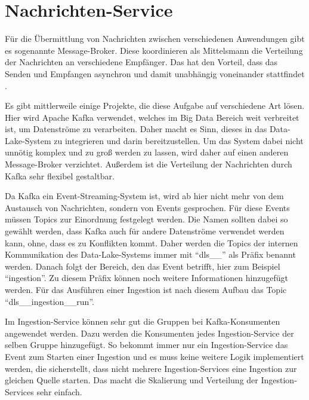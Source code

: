 \section{Nachrichten-Service}

Für die Übermittlung von Nachrichten zwischen verschiedenen Anwendungen gibt es sogenannte Message-Broker.
Diese koordinieren als Mittelsmann die Verteilung der Nachrichten an verschiedene Empfänger.
Das hat den Vorteil, dass das Senden und Empfangen asynchron und damit unabhängig voneinander stattfindet \parencite{message-broker}.

Es gibt mittlerweile einige Projekte, die diese Aufgabe auf verschiedene Art lösen.
Hier wird Apache Kafka verwendet, welches im Big Data Bereich weit verbreitet ist, um Datenströme zu verarbeiten.
Daher macht es Sinn, dieses in das Data-Lake-System zu integrieren und darin bereitzustellen.
Um das System dabei nicht unnötig komplex und zu groß werden zu lassen, wird daher auf einen anderen Message-Broker verzichtet.
Außerdem ist die Verteilung der Nachrichten durch Kafka sehr flexibel gestaltbar.

Da Kafka ein Event-Streaming-System ist, wird ab hier nicht mehr von dem Austausch von Nachrichten, sondern von Events gesprochen.
Für diese Events müssen Topics zur Einordnung festgelegt werden.
Die Namen sollten dabei so gewählt werden, dass Kafka auch für andere Datenströme verwendet werden kann, ohne, dass es zu Konflikten kommt.
Daher werden die Topics der internen Kommunikation des Data-Lake-Systems immer mit "`dls\_\_"' als Präfix benannt werden.
Danach folgt der Bereich, den das Event betrifft, hier zum Beispiel "`ingestion"'.
Zu diesem Präfix können noch weitere Informationen hinzugefügt werden.
Für das Ausführen einer Ingestion ist nach diesem Aufbau das Topic "`dls\_\_ingestion\_\_run"'.

Im Ingestion-Service können sehr gut die Gruppen bei Kafka-Konsumenten angewendet werden.
Dazu werden die Konsumenten jedes Ingestion-Service der selben Gruppe hinzugefügt.
So bekommt immer nur ein Ingestion-Service das Event zum Starten einer Ingestion und es muss keine weitere Logik implementiert werden, die sicherstellt, dass nicht mehrere Ingestion-Services eine Ingestion zur gleichen Quelle starten.
Das macht die Skalierung und Verteilung der Ingestion-Services sehr einfach.